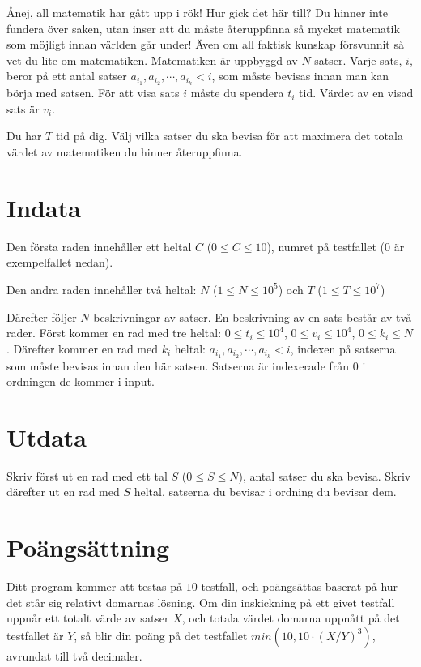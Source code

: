 
Ånej, all matematik har gått upp i rök! Hur gick det här till? Du hinner inte fundera över saken, 
utan inser att du måste återuppfinna så mycket matematik som möjligt innan världen går under!
Även om all faktisk kunskap försvunnit så vet du lite om matematiken. 
Matematiken är uppbyggd av $N$ satser. Varje sats, $i$, beror på ett antal satser $a_{i_1}, a_{i_2}, \cdots, a_{i_k} < i$, 
som måste bevisas innan man kan börja med satsen. För att visa sats $i$ måste du spendera $t_i$ tid. 
Värdet av en visad sats är $v_i$.

Du har $T$ tid på dig. Välj vilka satser du ska bevisa för att maximera det totala värdet av matematiken du hinner återuppfinna.

\section*{Indata}
Den första raden innehåller ett heltal $C$ ($0 \leq C \leq 10$), numret på testfallet ($0$ är exempelfallet nedan).

Den andra raden innehåller två heltal: $N$ ($1 \le N \le 10^5$) och $T$ ($1 \le T \le 10^7$)

Därefter följer $N$ beskrivningar av satser.
En beskrivning av en sats består av två rader. Först kommer en rad med tre heltal: $0 \le t_i \le 10^4$, $0 \le v_i \le 10^4$, $0 \le k_i \le N$. 
Därefter kommer en rad med $k_i$ heltal: $a_{i_1}, a_{i_2}, \cdots, a_{i_k} < i$, indexen på satserna som måste bevisas innan den här satsen.
Satserna är indexerade från 0 i ordningen de kommer i input.

\section*{Utdata}
Skriv först ut en rad med ett tal $S$ ($0 \le S \le N$), antal satser du ska bevisa. Skriv därefter ut en rad med $S$ heltal, satserna du bevisar i ordning du bevisar dem.

\section*{Poängsättning}
Ditt program kommer att testas på $10$ testfall, och poängsättas baserat på hur det står sig relativt domarnas lösning.
Om din inskickning på ett givet testfall uppnår ett totalt värde av satser $X$, och totala värdet domarna uppnått på det testfallet är $Y$,
så blir din poäng på det testfallet $min(10, 10 \cdot (X / Y)^3)$, avrundat till två decimaler.

